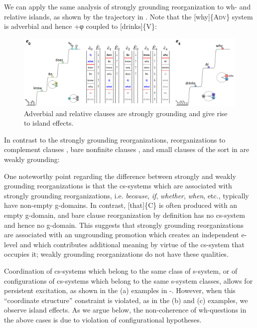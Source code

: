  We can apply the same analysis of strongly grounding reorganization to wh- and relative islands, as shown by the trajectory in {}. Note that the [why]\{A\textsc{dv}\} system is adverbial and hence +φ coupled to [drinks]\{V\}:

  
\begin{figure}
\includegraphics[width=\textwidth]{figures/Tilsen-img164.png}
\caption{Adverbial and relative clauses are strongly grounding and give rise to island effects.}
\label{fig:7:20}
\end{figure}
 

  In contrast to the strongly grounding reorganizations, reorganizations to complement clauses , bare nonfinite clauses , and small clauses of the sort in  are weakly grounding:

\ea\label{ex:7:21}
\label{ex:7:21a}
\label{ex:7:21b}
\label{ex:7:21c}
\z
\z

  One noteworthy point regarding the difference between strongly and weakly grounding reorganizations is that the cs-systems which are associated with strongly grounding reorganizations, i.e. \textit{because}, \textit{if}, \textit{whether}, \textit{when}, etc., typically have non-empty g-domains. In contrast, [that]\{C\} is often produced with an empty g-domain, and bare clause reorganization by definition has no cs-system and hence no g-domain. This suggests that strongly grounding reorganizations are associated with an ungrounding promotion which creates an independent e-level and which contributes additional meaning by virtue of the cs-system that occupies it; weakly grounding reorganizations do not have these qualities.

  Coordination of cs-systems which belong to the same class of s-system, or of configurations of cs-systems which belong to the same s-system classes, allows for persistent excitation, as shown in the (a) examples in {-}. However, when this “coordinate structure” constraint is violated, as in the (b) and (c) examples, we observe island effects. As we argue below, the non-coherence of wh-questions in the above cases is due to violation of configurational hypotheses.

